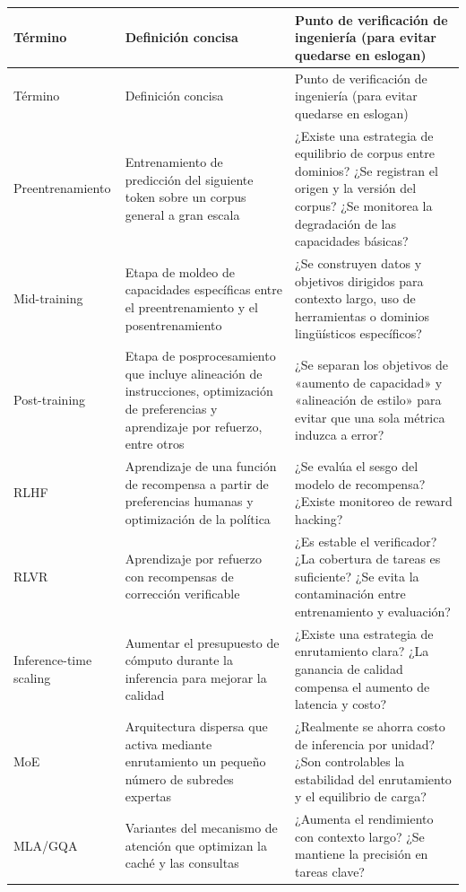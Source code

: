 \documentclass[a4paper]{article}
\begin{document}
\begin{longtable}{p{}p{}p{}}
\toprule
Término & Definición concisa & Punto de verificación de ingeniería (para evitar quedarse en eslogan) \\
\midrule
\endfirsthead
\toprule
Término & Definición concisa & Punto de verificación de ingeniería (para evitar quedarse en eslogan) \\
\midrule
\endhead
Preentrenamiento & Entrenamiento de predicción del siguiente token sobre un corpus general a gran escala & ¿Existe una estrategia de equilibrio de corpus entre dominios? ¿Se registran el origen y la versión del corpus? ¿Se monitorea la degradación de las capacidades básicas? \\
Mid-training & Etapa de moldeo de capacidades específicas entre el preentrenamiento y el posentrenamiento & ¿Se construyen datos y objetivos dirigidos para contexto largo, uso de herramientas o dominios lingüísticos específicos? \\
Post-training & Etapa de posprocesamiento que incluye alineación de instrucciones, optimización de preferencias y aprendizaje por refuerzo, entre otros & ¿Se separan los objetivos de «aumento de capacidad» y «alineación de estilo» para evitar que una sola métrica induzca a error? \\
RLHF & Aprendizaje de una función de recompensa a partir de preferencias humanas y optimización de la política & ¿Se evalúa el sesgo del modelo de recompensa? ¿Existe monitoreo de reward hacking? \\
RLVR & Aprendizaje por refuerzo con recompensas de corrección verificable & ¿Es estable el verificador? ¿La cobertura de tareas es suficiente? ¿Se evita la contaminación entre entrenamiento y evaluación? \\
Inference-time scaling & Aumentar el presupuesto de cómputo durante la inferencia para mejorar la calidad & ¿Existe una estrategia de enrutamiento clara? ¿La ganancia de calidad compensa el aumento de latencia y costo? \\
MoE & Arquitectura dispersa que activa mediante enrutamiento un pequeño número de subredes expertas & ¿Realmente se ahorra costo de inferencia por unidad? ¿Son controlables la estabilidad del enrutamiento y el equilibrio de carga? \\
MLA/GQA & Variantes del mecanismo de atención que optimizan la caché y las consultas & ¿Aumenta el rendimiento con contexto largo? ¿Se mantiene la precisión en tareas clave? \\

\end{longtable}
\end{document}
